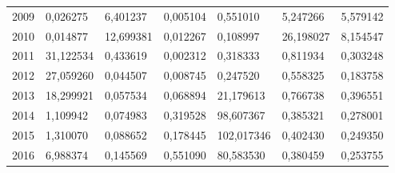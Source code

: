 \begin{table}
\begin{tabular}{p{1cm}p{2cm}p{2cm}p{2cm}p{2cm}p{2cm}p{2cm}}
 2009 &                               0,026275 &  6,401237 &                        0,005104 &                   0,551010 &                                    5,247266 &                            5,579142 \\
 2010 &                               0,014877 & 12,699381 &                        0,012267 &                   0,108997 &                                   26,198027 &                            8,154547 \\
 2011 &                              31,122534 &  0,433619 &                        0,002312 &                   0,318333 &                                    0,811934 &                            0,303248 \\
 2012 &                              27,059260 &  0,044507 &                        0,008745 &                   0,247520 &                                    0,558325 &                            0,183758 \\
 2013 &                              18,299921 &  0,057534 &                        0,068894 &                  21,179613 &                                    0,766738 &                            0,396551 \\
 2014 &                               1,109942 &  0,074983 &                        0,319528 &                  98,607367 &                                    0,385321 &                            0,278001 \\
 2015 &                               1,310070 &  0,088652 &                        0,178445 &                 102,017346 &                                    0,402430 &                            0,249350 \\
 2016 &                               6,988374 &  0,145569 &                        0,551090 &                  80,583530 &                                    0,380459 &                            0,253755 \\
\bottomrule
\end{tabular}
\end{table}
